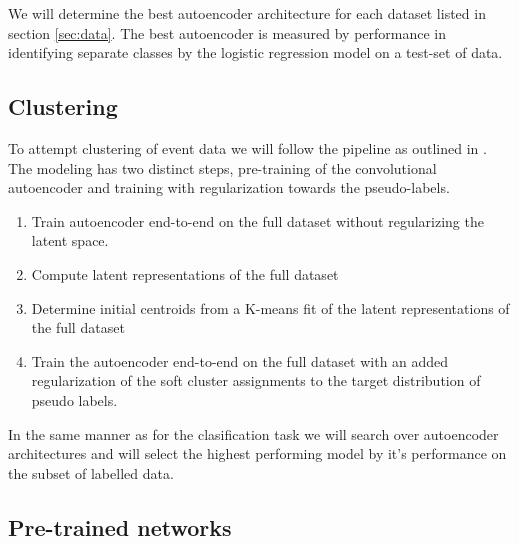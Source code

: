 We will determine the best autoencoder architecture for each dataset listed in section \ref{sec:data}. The best autoencoder is measured by performance in identifying separate classes by the logistic regression model on a test-set of data. 

\subsection{Clustering}

To attempt clustering of event data we will follow the pipeline as outlined in \citet{Guo2017}. The modeling has two distinct steps, pre-training of the convolutional autoencoder and training with regularization towards the pseudo-labels. 

\begin{enumerate}
\item Train autoencoder end-to-end on the full dataset without regularizing the latent space. 
\item Compute latent representations of the full dataset
\item Determine initial centroids from a K-means fit of the latent representations of the full dataset
\item Train the autoencoder end-to-end on the full dataset with an added regularization of the soft cluster assignments to the target distribution of pseudo labels.
\end{enumerate}

In the same manner as for the clasification task we will search over autoencoder architectures and will select the highest performing model by it's performance on the subset of labelled data.

\subsection{Pre-trained networks}

